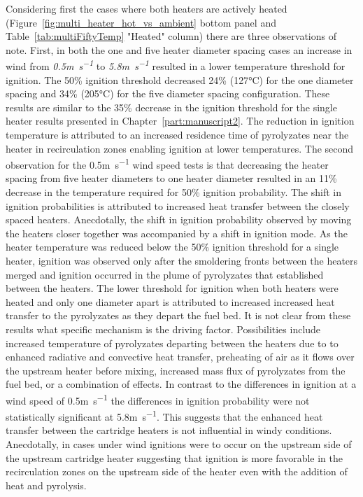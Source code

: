     Considering first the cases where both heaters are actively heated (Figure~\ref{fig:multi_heater_hot_vs_ambient} bottom panel and Table~\ref{tab:multiFiftyTemp} "Heated" column) there are three observations of note. First, in both the one and five heater diameter spacing cases an increase in wind from \textit{0.5\si{\meter\per\second}} to \textit{5.8\si{\meter\per\second}} resulted in a lower temperature threshold for ignition. The 50\% ignition threshold decreased 24\% (127\si{\celsius}) for the one diameter spacing and 34\% (205\si{\celsius}) for the five diameter spacing configuration. These results are similar to the 35\% decrease in the ignition threshold for the single heater results presented in Chapter~\ref{part:manuscript2}. The reduction in ignition temperature is attributed to an increased residence time of pyrolyzates near the heater in recirculation zones enabling ignition at lower temperatures. The second observation for the 0.5\si{\meter\per\second} wind speed tests is that decreasing the heater spacing from five heater diameters to one heater diameter resulted in an 11\% decrease in the temperature required for 50\% ignition probability. The shift in ignition probabilities is attributed to increased heat transfer between the closely spaced heaters. Anecdotally, the shift in ignition probability observed by moving the heaters closer together was accompanied by a shift in ignition mode. As the heater temperature was reduced below the 50\% ignition threshold for a single heater, ignition was observed only after the smoldering fronts between the heaters merged and ignition occurred in the plume of pyrolyzates that established between the heaters. The lower threshold for ignition when both heaters were heated and only one diameter apart is attributed to increased increased heat transfer to the pyrolyzates as they depart the fuel bed. It is not clear from these results what specific mechanism is the driving factor. Possibilities include increased temperature of pyrolyzates departing between the heaters due to to enhanced radiative and convective heat transfer, preheating of air as it flows over the upstream heater before mixing, increased mass flux of pyrolyzates from the fuel bed, or a combination of effects. In contrast to the differences in ignition at a wind speed of 0.5\si{\meter\per\second} the differences in ignition probability were not statistically significant at 5.8\si{\meter\per\second}. This suggests that the enhanced heat transfer between the cartridge heaters is not influential in windy conditions. Anecdotally, in cases under wind ignitions were to occur on the upstream side of the upstream cartridge heater suggesting that ignition is more favorable in the recirculation zones on the upstream side of the heater even with the addition of heat and pyrolysis.
   
